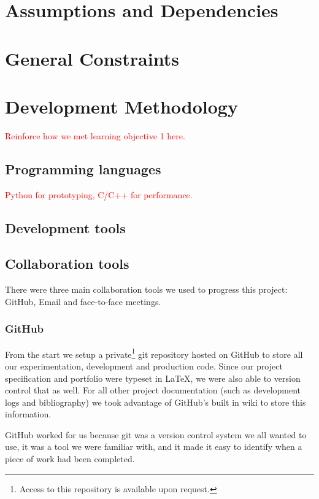 \documentclass[11pt,a4paper,titlepage]{report}
\begin{document}
\section{Assumptions and Dependencies}
\section{General Constraints}
\section{Development Methodology}

\textcolor{red}{Reinforce how we met learning objective 1 here.}


\subsection{Programming languages}

\textcolor{red}{Python for prototyping, C/C++ for performance.}


\subsection{Development tools}

\subsection{Collaboration tools}

There were three main collaboration tools we used to progress this project: GitHub, Email and face-to-face meetings.

\subsubsection{GitHub}

From the start we setup a private\footnote{Access to this repository is available upon request.} git repository hosted on GitHub to store all our experimentation, development and production code. Since our project specification and portfolio were typeset in \LaTeX, we were also able to version control that as well. For all other project documentation (such as development logs and bibliography) we took advantage of GitHub's built in wiki to store this information.

GitHub worked for us because git was a version control system we all wanted to use, it was a tool we were familiar with, and it made it easy to identify when a piece of work had been completed.
\end{document}

